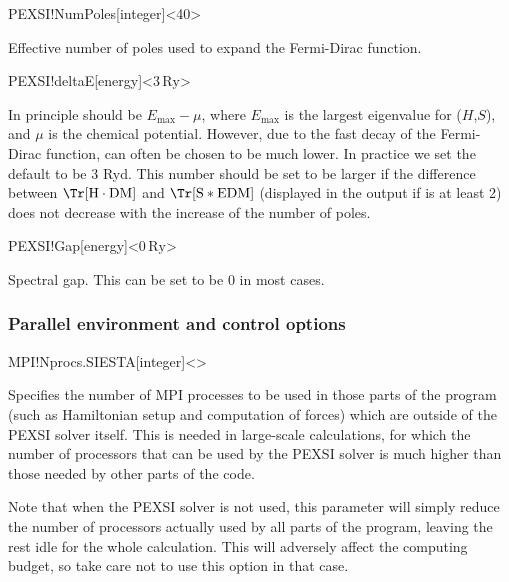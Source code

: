 \begin{fdfentry}{PEXSI!NumPoles}[integer]<40>

  Effective number of poles used to expand the Fermi-Dirac function.
  
\end{fdfentry}

\begin{fdfentry}{PEXSI!deltaE}[energy]<$3\,\mathrm{Ry}$>
  
  In principle  should be $E_{\max}-\mu$, where
  $E_{\max}$ is the largest eigenvalue for ($H$,$S$), and $\mu$ is the
  chemical potential. However, due to the fast decay of the
  Fermi-Dirac function,  can often be chosen to be
  much lower.  In practice we set the default to be 3 Ryd.  This
  number should be set to be larger if the difference between
  $\Tr[\mathrm H\cdot\mathrm{DM}]$ and $\Tr[\mathrm S*\mathrm{EDM}]$
  (displayed in the output if  is at least 2)
  does not decrease with the increase of the number of poles.

\end{fdfentry}


\begin{fdfentry}{PEXSI!Gap}[energy]<$0\,\mathrm{Ry}$>

  Spectral gap. This can be set to be 0 in most cases.

\end{fdfentry}

\subsubsection{Parallel environment and control options}

\begin{fdfentry}{MPI!Nprocs.SIESTA}[integer]<>

  Specifies the number of MPI processes to be used in those parts of
  the program (such as Hamiltonian setup and computation of forces)
  which are outside of the PEXSI solver itself. This is needed in
  large-scale calculations, for which the number of processors that
  can be used by the PEXSI solver is much higher than those needed by
  other parts of the code.
  
  Note that when the PEXSI solver is not used, this parameter will
  simply reduce the number of processors actually used by all parts of
  the program, leaving the rest idle for the whole calculation. This
  will adversely affect the computing budget, so take care not to use
  this option in that case.
  
\end{fdfentry}

